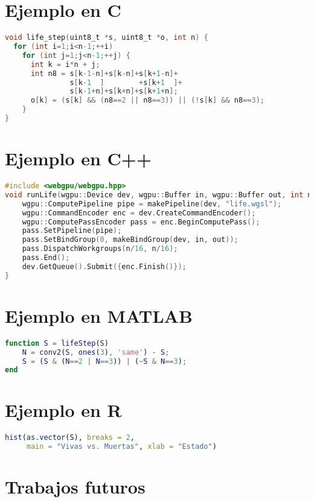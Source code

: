 \documentclass{report}
\begin{document}
\begin{umaappendices}


\section{Ejemplo en C}
\begin{lstlisting}[language=C,
  caption={C: Paso ingenuo de Game of Life en CPU},label={lst:c-life}]
void life_step(uint8_t *s, uint8_t *o, int n) {
  for (int i=1;i<n-1;++i)
    for (int j=1;j<n-1;++j) {
      int k = i*n + j;
      int n8 = s[k-1-n]+s[k-n]+s[k+1-n]+
               s[k-1  ]        +s[k+1  ]+
               s[k-1+n]+s[k+n]+s[k+1+n];
      o[k] = (s[k] && (n8==2 || n8==3)) || (!s[k] && n8==3);
    }
}
\end{lstlisting}

\section{Ejemplo en C++}
\begin{lstlisting}[language=C++,
  caption={C++17: Lanzamiento de un shader WGSL},label={lst:cpp-dispatch}]
#include <webgpu/webgpu.hpp>
void runLife(wgpu::Device dev, wgpu::Buffer in, wgpu::Buffer out, int n) {
    wgpu::ComputePipeline pipe = makePipeline(dev, "life.wgsl");
    wgpu::CommandEncoder enc = dev.CreateCommandEncoder();
    wgpu::ComputePassEncoder pass = enc.BeginComputePass();
    pass.SetPipeline(pipe);
    pass.SetBindGroup(0, makeBindGroup(dev, in, out));
    pass.DispatchWorkgroups(n/16, n/16);
    pass.End();
    dev.GetQueue().Submit({enc.Finish()});
}
\end{lstlisting}

\section{Ejemplo en MATLAB}
\begin{lstlisting}[language=Matlab,
  caption={MATLAB: Life mediante convolución},label={lst:matlab-life}]
function S = lifeStep(S)
    N = conv2(S, ones(3), 'same') - S;
    S = (S & (N==2 | N==3)) | (~S & N==3);
end
\end{lstlisting}

\section{Ejemplo en R}
\begin{lstlisting}[language=R,
  caption={R: Histograma de estados},label={lst:r-hist}]
hist(as.vector(S), breaks = 2,
     main = "Vivas vs. Muertas", xlab = "Estado")
\end{lstlisting}

\section{Trabajos futuros}
\blindtext[1]
\end{umaappendices}

\backmatter
\printbibliography[title={Bibliografía}]
\cleardoublepage
\MakeUMABackCover
\end{document}
